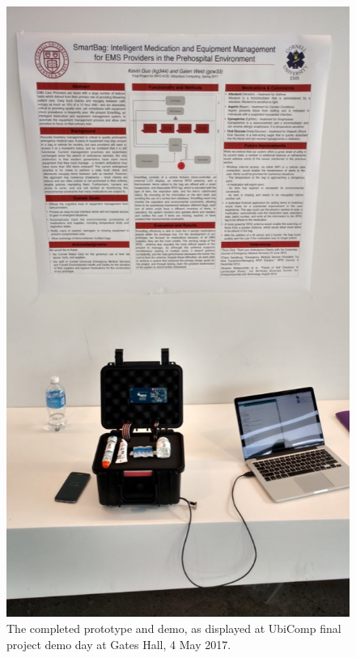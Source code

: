 \documentclass{sigchi}
\begin{document}
\begin{figure}[!ht]
\centering
\includegraphics[width=\columnwidth]{demo}
\caption{The completed prototype and demo, as displayed at UbiComp final
	project	demo day at Gates Hall, 4 May 2017.}
\label{fig:demo}
\end{figure}
\end{document}
